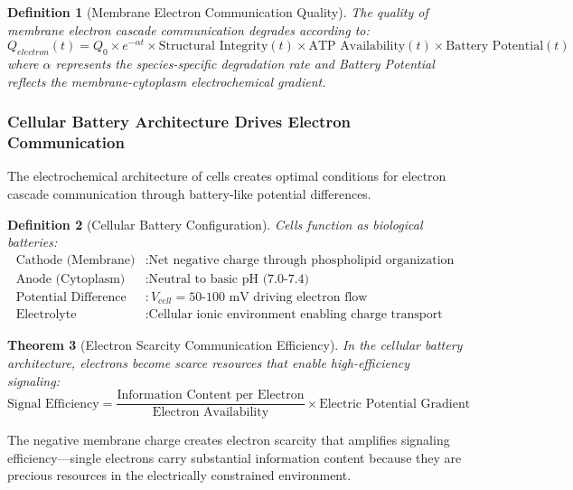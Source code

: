 \documentclass[12pt,a4paper]{article}
\newtheorem{theorem}{Theorem}[section]
\newtheorem{definition}[theorem]{Definition}
\begin{document}
\begin{definition}[Membrane Electron Communication Quality]
The quality of membrane electron cascade communication degrades according to:
\begin{equation}
Q_{electron}(t) = Q_0 \times e^{-\alpha t} \times \text{Structural Integrity}(t) \times \text{ATP Availability}(t) \times \text{Battery Potential}(t)
\end{equation}
where $\alpha$ represents the species-specific degradation rate and Battery Potential reflects the membrane-cytoplasm electrochemical gradient.
\end{definition}

\subsubsection{Cellular Battery Architecture Drives Electron Communication}

The electrochemical architecture of cells creates optimal conditions for electron cascade communication through battery-like potential differences.

\begin{definition}[Cellular Battery Configuration]
Cells function as biological batteries:
\begin{align}
\text{Cathode (Membrane)} &: \text{Net negative charge through phospholipid organization} \\
\text{Anode (Cytoplasm)} &: \text{Neutral to basic pH (7.0-7.4)} \\
\text{Potential Difference} &: V_{cell} = 50\text{-}100 \text{ mV driving electron flow} \\
\text{Electrolyte} &: \text{Cellular ionic environment enabling charge transport}
\end{align}
\end{definition}

\begin{theorem}[Electron Scarcity Communication Efficiency]
In the cellular battery architecture, electrons become scarce resources that enable high-efficiency signaling:
\begin{equation}
\text{Signal Efficiency} = \frac{\text{Information Content per Electron}}{\text{Electron Availability}} \times \text{Electric Potential Gradient}
\end{equation}
\end{theorem}

The negative membrane charge creates electron scarcity that amplifies signaling efficiency—single electrons carry substantial information content because they are precious resources in the electrically constrained environment.
\end{document}
